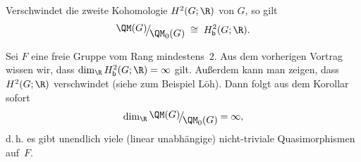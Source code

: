 \begin{thKorollar}
    Verschwindet die zweite Kohomologie $H^2(G;\R)$ von $G$, so gilt
    \[ \Quot{\QM(G)}{\QM_0(G)} \;\cong\; \Hb^2(G;\R)  . \]
\end{thKorollar}

\begin{thBeispiel}
    Sei $F$ eine freie Gruppe vom Rang mindestens~$2$. Aus dem vorherigen
    Vortrag wissen wir, dass $\dim_{\R} \Hb^2(G;\R) = \infty$ gilt. Außerdem
    kann man zeigen, dass $H^2(G;\R)$ verschwindet (siehe zum Beispiel
    Löh\cite[Ch.\,1,.4,\;Example~1.3.13]{lecnotes:loeh:bdcoho}).
    Dann folgt aus dem Korollar sofort
    \[ \dim_{\R} \Quot{\QM(G)}{\QM_0(G)} = \infty  , \]
    d.\,h. es gibt unendlich viele (linear unabhängige) nicht-triviale
    Quasimorphismen auf~$F$.
\end{thBeispiel}
